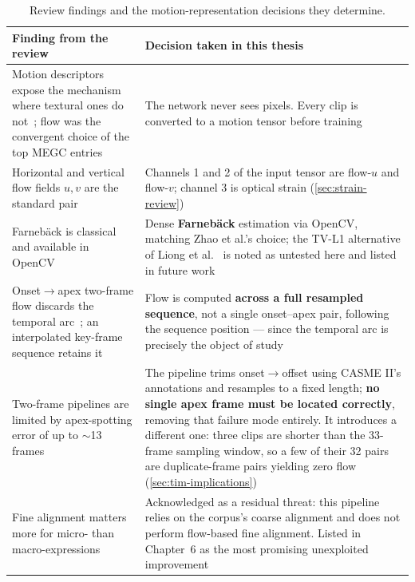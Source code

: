 \begin{table}[htbp]
	\centering
	\footnotesize
	\begin{tabular}{p{6.0cm} p{6.5cm}}
		\hline
		\textbf{Finding from the review} & \textbf{Decision taken in this thesis} \\
		\hline
		Motion descriptors expose the mechanism where textural ones do not~\cite{xu2017}; flow was the convergent choice of the top MEGC entries~\cite{see2019} & The network never sees pixels. Every clip is converted to a motion tensor before training \\
		Horizontal and vertical flow fields $u, v$ are the standard pair~\cite{liong2019a} & Channels 1 and 2 of the input tensor are flow-$u$ and flow-$v$; channel 3 is optical strain (\autoref{sec:strain-review}) \\
		Farneb\"ack is classical and available in OpenCV~\cite{zhaoS2021} & Dense \textbf{Farneb\"ack} estimation via OpenCV, matching Zhao et al.'s choice; the TV-L1 alternative of Liong et al.~\cite{liong2019a} is noted as untested here and listed in future work \\
		Onset$\rightarrow$apex two-frame flow discards the temporal arc~\cite{liong2019a,liong2019b}; an interpolated key-frame sequence retains it~\cite{zhaoS2021} & Flow is computed \textbf{across a full resampled sequence}, not a single onset--apex pair, following the sequence position --- since the temporal arc is precisely the object of study \\
		Two-frame pipelines are limited by apex-spotting error of up to $\sim$13 frames~\cite{liong2019a} & The pipeline trims onset$\rightarrow$offset using CASME II's annotations and resamples to a fixed length; \textbf{no single apex frame must be located correctly}, removing that failure mode entirely. It introduces a different one: three clips are shorter than the 33-frame sampling window, so a few of their 32 pairs are duplicate-frame pairs yielding zero flow (\autoref{sec:tim-implications}) \\
		Fine alignment matters more for micro- than macro-expressions~\cite{xu2017} & Acknowledged as a residual threat: this pipeline relies on the corpus's coarse alignment and does not perform flow-based fine alignment. Listed in Chapter~6 as the most promising unexploited improvement \\
		\hline
	\end{tabular}
	\caption[Review findings and the motion-representation decisions they determine]{Review findings and the motion-representation decisions they determine.}
	\label{tab:flow-decisions}
\end{table}

